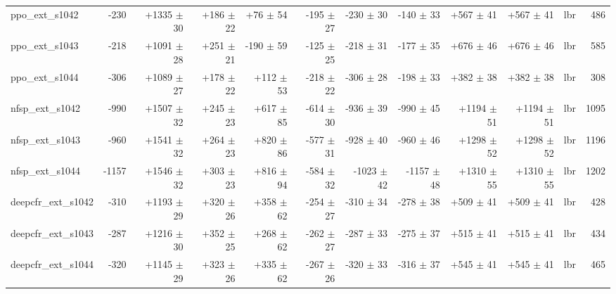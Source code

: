 \begin{tabular}{lrrrrrrrrrrr}
ppo\_ext\_s1042 & -230 & +1335 $\pm$ 30 & +186 $\pm$ 22 & +76 $\pm$ 54 & -195 $\pm$ 27 & -230 $\pm$ 30 & -140 $\pm$ 33 & +567 $\pm$ 41 & +567 $\pm$ 41 & lbr & 486 \\
ppo\_ext\_s1043 & -218 & +1091 $\pm$ 28 & +251 $\pm$ 21 & -190 $\pm$ 59 & -125 $\pm$ 25 & -218 $\pm$ 31 & -177 $\pm$ 35 & +676 $\pm$ 46 & +676 $\pm$ 46 & lbr & 585 \\
ppo\_ext\_s1044 & -306 & +1089 $\pm$ 27 & +178 $\pm$ 22 & +112 $\pm$ 53 & -218 $\pm$ 22 & -306 $\pm$ 28 & -198 $\pm$ 33 & +382 $\pm$ 38 & +382 $\pm$ 38 & lbr & 308 \\
nfsp\_ext\_s1042 & -990 & +1507 $\pm$ 32 & +245 $\pm$ 23 & +617 $\pm$ 85 & -614 $\pm$ 30 & -936 $\pm$ 39 & -990 $\pm$ 45 & +1194 $\pm$ 51 & +1194 $\pm$ 51 & lbr & 1095 \\
nfsp\_ext\_s1043 & -960 & +1541 $\pm$ 32 & +264 $\pm$ 23 & +820 $\pm$ 86 & -577 $\pm$ 31 & -928 $\pm$ 40 & -960 $\pm$ 46 & +1298 $\pm$ 52 & +1298 $\pm$ 52 & lbr & 1196 \\
nfsp\_ext\_s1044 & -1157 & +1546 $\pm$ 32 & +303 $\pm$ 23 & +816 $\pm$ 94 & -584 $\pm$ 32 & -1023 $\pm$ 42 & -1157 $\pm$ 48 & +1310 $\pm$ 55 & +1310 $\pm$ 55 & lbr & 1202 \\
deepcfr\_ext\_s1042 & -310 & +1193 $\pm$ 29 & +320 $\pm$ 26 & +358 $\pm$ 62 & -254 $\pm$ 27 & -310 $\pm$ 34 & -278 $\pm$ 38 & +509 $\pm$ 41 & +509 $\pm$ 41 & lbr & 428 \\
deepcfr\_ext\_s1043 & -287 & +1216 $\pm$ 30 & +352 $\pm$ 25 & +268 $\pm$ 62 & -262 $\pm$ 27 & -287 $\pm$ 33 & -275 $\pm$ 37 & +515 $\pm$ 41 & +515 $\pm$ 41 & lbr & 434 \\
deepcfr\_ext\_s1044 & -320 & +1145 $\pm$ 29 & +323 $\pm$ 26 & +335 $\pm$ 62 & -267 $\pm$ 26 & -320 $\pm$ 33 & -316 $\pm$ 37 & +545 $\pm$ 41 & +545 $\pm$ 41 & lbr & 465 \\
\bottomrule
\end{tabular}
